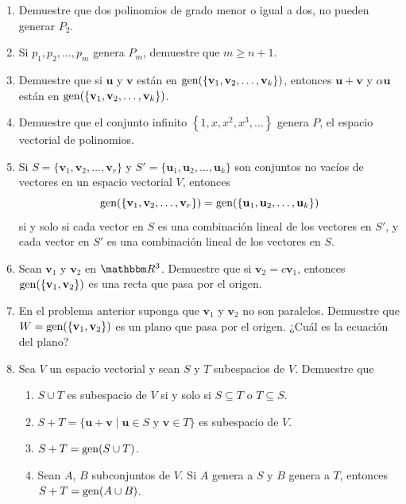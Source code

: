 \begin{enumerate}[start=61]
    \item Demuestre que dos polinomios de grado menor o igual a dos, no pueden generar $P_{2}$.
    \item Si $p_{1}, p_{2}, \dots, p_{m}$ genera $P_{m}$, demuestre que $m \geq n+1$.
    \item Demuestre que si $\mathbf{u}$ y $\mathbf{v}$ están en $\operatorname{gen} (\{\mathbf{v}_{1}, \mathbf{v}_{2}, \dots, \mathbf{v}_{k}\})$, entonces $\mathbf{u}+\mathbf{v}$ y $\alpha \mathbf{u}$ están en $\operatorname{gen} (\{\mathbf{v}_{1}, \mathbf{v}_{2}, \dots, \mathbf{v}_{k}\})$.
    \item Demuestre que el conjunto infinito $\left\{1, x, x^{2}, x^{3}, \dots\right\}$ genera $P$, el espacio vectorial de polinomios.
    \item Si $S = \{\mathbf{v}_1, \mathbf{v}_2, \dots, \mathbf{v}_r\}$ y $S' = \{\mathbf{u}_1, \mathbf{u}_2, \dots, \mathbf{u}_k\}$ son conjuntos no vacíos de vectores en un espacio vectorial $V$, entonces
    $$\operatorname{gen} (\{\mathbf{v}_1, \mathbf{v}_2, \dots, \mathbf{v}_r\}) = \operatorname{gen} (\{\mathbf{u}_1, \mathbf{u}_2, \dots, \mathbf{u}_k\})$$
    si y solo si cada vector en $S$ es una combinación lineal de los vectores en $S'$, y cada vector en $S'$ es una combinación lineal de los vectores en $S$.
    \item Sean $\mathbf{v}_{1}$ y $\mathbf{v}_{2}$ en $\RR[3]$. Demuestre que si $\mathbf{v}_{2}=c \mathbf{v}_{1}$, entonces $\operatorname{gen} (\{\mathbf{v}_{1}, \mathbf{v}_{2}\})$ es una recta que pasa por el origen.
    \item En el problema anterior suponga que $\mathbf{v}_{1}$ y $\mathbf{v}_{2}$ no son paralelos. Demuestre que $W= \operatorname{gen} (\{\mathbf{v}_{1}, \mathbf{v}_{2}\})$ es un plano que pasa por el origen. ¿Cuál es la ecuación del plano?
    \item Sea $V$ un espacio vectorial y sean $S$ y $T$ subespacios de $V$. Demuestre que\label{ejercicio_sumadesubs}
    \begin{enumerate}[label=\roman*)]
        \item $S \cup T$ es subespacio de $V$ si y solo si $S \subseteq T$ o $T \subseteq S$.
        \item $S + T = \{ \mathbf{u} + \mathbf{v} \mid \mathbf{u} \in S \text{ y } \mathbf{v} \in T \}$ es subespacio de $V$.
        \item $S + T = \operatorname{gen}(S \cup T)$.
        \newpage
        \item Sean $A$, $B$ subconjuntos de $V$. Si $A$ genera a $S$ y $B$ genera a $T$, entonces $S + T = \operatorname{gen}(A \cup B)$.
    \end{enumerate}
\end{enumerate}
